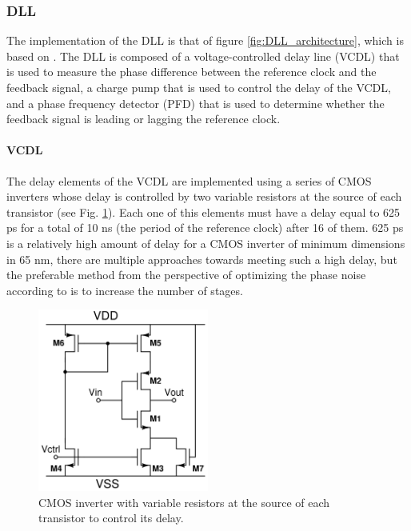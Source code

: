 \subsubsection{DLL}
The implementation of the DLL is that of figure \ref{fig:DLL_architecture}, which is based on \cite{bib:DLL_Razavi_paper}. The DLL is composed of a voltage-controlled delay line (VCDL) that is used
to measure the phase difference between the reference clock and the feedback signal, a charge pump that is used to control the delay of the VCDL, and a phase frequency detector (PFD) that is used to
determine whether the feedback signal is leading or lagging the reference clock.

\paragraph{VCDL}
The delay elements of the VCDL are implemented using a series of CMOS inverters whose delay is controlled by two variable resistors at the source of each transistor (see Fig. \ref{fig:VCDL_delay_elements}).
Each one of this elements must have a delay equal to 625 ps for a total of 10 ns (the period of the reference clock) after 16 of them. 625 ps is a relatively high amount of delay for a CMOS inverter of
minimum dimensions in 65 nm, there are multiple approaches towards meeting such a high delay, but the preferable method from the perspective of optimizing the phase noise according to \cite{bib:Razavi_PLL_book}
is to increase the number of stages.

\begin{figure}[H]
    \centering
    \includegraphics[width=0.5\textwidth]{figures/VCDL_delay_elements.png}
    \caption{CMOS inverter with variable resistors at the source of each transistor to control its delay.}
    \label{fig:VCDL_delay_elements}
\end{figure}

